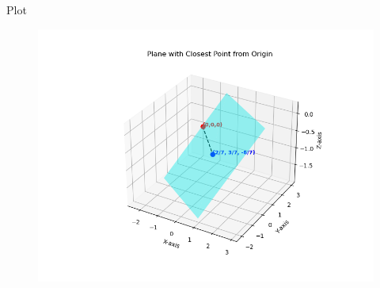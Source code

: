 \documentclass{beamer}
\begin{document}
\begin{frame}{Plot}
    \begin{figure}
        \centering
        \includegraphics[width=0.75\linewidth]{figs/fig1.png}
        \caption{}
        \label{fig:placeholder}
    \end{figure}
\end{frame}
\end{document}
